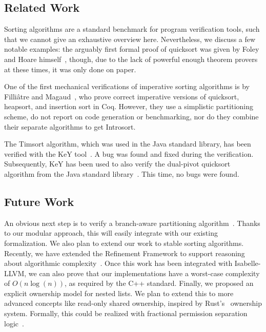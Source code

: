 \documentclass[runningheads]{llncs}
\begin{document}
{\subsection{Related Work}
Sorting algorithms are a standard benchmark for program verification tools, such that we cannot give an exhaustive overview here.
Nevertheless, we discuss a few notable examples: the arguably first formal proof of quicksort was given
by Foley and Hoare himself~\cite{FoHoa71}, though, due to the lack of powerful enough theorem provers at these times,
it was only done on paper.

One of the first mechanical verifications of imperative sorting algorithms is by
Filli{\^a}tre and Magaud~\cite{FiMa99}, who prove correct imperative versions of quicksort, heapsort, and insertion sort in Coq.
However, they use a simplistic partitioning scheme, do not report on code generation or benchmarking,
nor do they combine their separate algorithms to get Introsort.

The Timsort algorithm, which was used in the Java standard library, has been verified
with the KeY tool~\cite{GRBBH15}. A bug was found and fixed during the verification.
Subsequently, KeY has been used to also verify the dual-pivot quicksort algorithm from the
Java standard library~\cite{BSSU17}. This time, no bugs were found.

\subsection{Future Work}
An obvious next step is to verify a branch-aware partitioning algorithm~\cite{EdWe16}.
Thanks to our modular approach, this will easily integrate with our existing formalization.
We also plan to extend our work to stable sorting algorithms.
Recently, we have extended the Refinement Framework to support reasoning about algorithmic complexity~\cite{HaLa19}.
Once this work has been integrated with Isabelle-LLVM, we can also prove that our implementations
have a worst-case complexity of $O(n\log(n))$, as required by the C++ standard.
Finally, we proposed an explicit ownership model for nested lists. We plan to extend this
to more advanced concepts like read-only shared ownership, inspired by Rust's~\cite{rustlang} ownership system.
Formally, this could be realized with fractional permission separation logic~\cite{BCOP05}.


%


}
\end{document}
